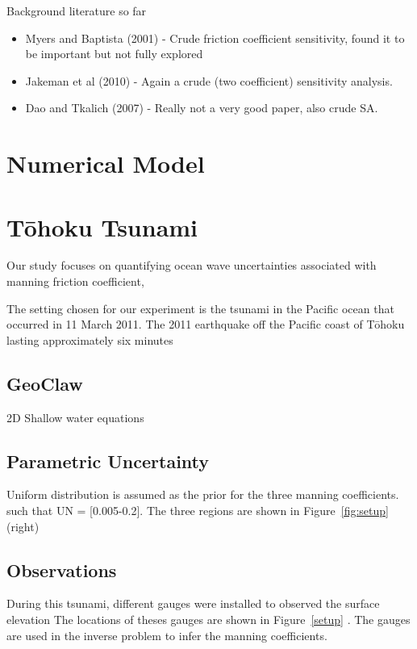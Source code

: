 
Background literature so far
\begin{itemize}
    \item Myers and Baptista (2001) - Crude friction coefficient sensitivity, found it to be important but not fully explored
    \item Jakeman et al (2010) - Again a crude (two coefficient) sensitivity analysis.
    \item Dao and Tkalich (2007) - Really not a very good paper, also crude SA.
\end{itemize}

\section{Numerical Model}



\section{T\={o}hoku Tsunami}
Our study focuses on quantifying ocean wave uncertainties associated with 
manning friction coefficient, 

The setting chosen for our experiment is the tsunami in the Pacific ocean 
that occurred in 11 March 2011. The 2011 earthquake off the Pacific coast of Tōhoku lasting approximately six minutes


\subsection{GeoClaw}
2D Shallow water equations


\subsection{Parametric Uncertainty}
Uniform distribution is assumed as the prior for the three manning coefficients.
such that UN = [0.005-0.2]. The three regions are shown in Figure~\ref{fig:setup}(right)

\subsection{Observations}
During this tsunami, different gauges were installed to observed the surface elevation
The locations of theses gauges are shown in Figure~\ref{setup} .
The gauges are used in the inverse problem to infer the manning coefficients.

